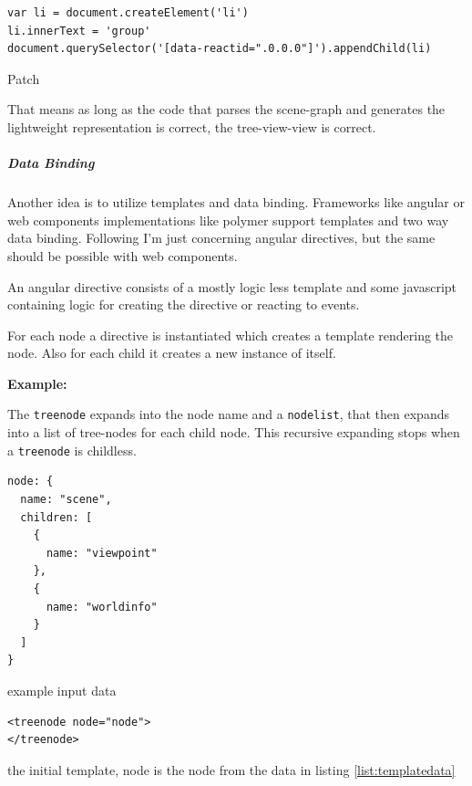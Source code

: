 \begin{listing}[H]
  \begin{verbatim}
var li = document.createElement('li')
li.innerText = 'group'
document.querySelector('[data-reactid=".0.0.0"]').appendChild(li)
  \end{verbatim}
  \caption{Patch}
\end{listing}

That means as long as the code that parses the scene-graph and generates
the lightweight representation is correct, the tree-view-view is
correct.

\subparagraph{Data Binding}
\label{data-binding}

Another idea is to utilize templates and data binding. Frameworks like
angular or web components implementations like polymer
support templates and two way data binding. Following I'm just
concerning angular directives, but the same should be possible with web
components.

An angular directive consists of a mostly logic less template and some
javascript containing logic for creating the directive or reacting to
events.

For each node a directive is instantiated which creates a template
rendering the node. Also for each child it creates a new instance of
itself.

\textbf{Example:}

The \texttt{treenode} expands into the node name and a \texttt{nodelist},
that then expands into a list of tree-nodes for each child node.
This recursive expanding stops when a \texttt{treenode} is childless.

\begin{listing}[H]
  \begin{verbatim}
node: {
  name: "scene",
  children: [
    {
      name: "viewpoint"
    },
    {
      name: "worldinfo"
    }
  ]
}
  \end{verbatim}
  \caption{example input data}
  \label{list:templatedata}
\end{listing}

\begin{listing}[H]
  \begin{verbatim}
<treenode node="node">
</treenode>
  \end{verbatim}
  \caption{the initial template, node is the node from the data in listing \ref{list:templatedata}}
\end{listing}

